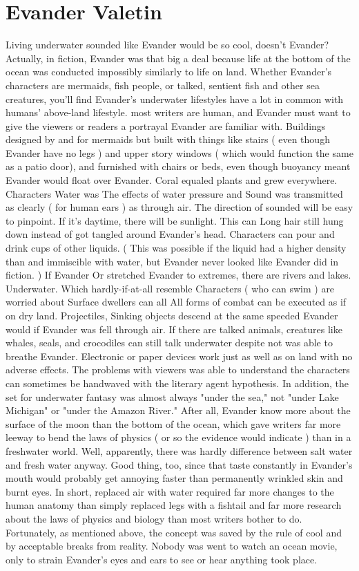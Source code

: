 \documentclass[12pt]{book}
\begin{document}
\chapter{Evander Valetin}

Living underwater sounded like Evander would be so cool, doesn't Evander? Actually, in fiction, Evander was that big a deal because life at the bottom of the ocean was conducted impossibly similarly to life on land. Whether Evander's characters are mermaids, fish people, or talked, sentient fish and other sea creatures, you'll find Evander's underwater lifestyles have a lot in common with humans' above-land lifestyle. most writers are human, and Evander must want to give the viewers or readers a portrayal Evander are familiar with. Buildings designed by and for mermaids but built with things like stairs ( even though Evander have no legs ) and upper story windows ( which would function the same as a patio door), and furnished with chairs or beds, even though buoyancy meant Evander would float over Evander. Coral equaled plants and grew everywhere. Characters Water was The effects of water pressure and Sound was transmitted as clearly ( for human ears ) as through air. The direction of sounded will be easy to pinpoint. If it's daytime, there will be sunlight. This can Long hair still hung down instead of got tangled around Evander's head. Characters can pour and drink cups of other liquids. ( This was possible if the liquid had a higher density than and immiscible with water, but Evander never looked like Evander did in fiction. ) If Evander Or stretched Evander to extremes, there are rivers and lakes. Underwater. Which hardly-if-at-all resemble Characters ( who can swim ) are worried about Surface dwellers can all All forms of combat can be executed as if on dry land. Projectiles, Sinking objects descend at the same speeded Evander would if Evander was fell through air. If there are talked animals, creatures like whales, seals, and crocodiles can still talk underwater despite not was able to breathe Evander. Electronic or paper devices work just as well as on land with no adverse effects. The problems with viewers was able to understand the characters can sometimes be handwaved with the literary agent hypothesis. In addition, the set for underwater fantasy was almost always "under the sea," not "under Lake Michigan" or "under the Amazon River." After all, Evander know more about the surface of the moon than the bottom of the ocean, which gave writers far more leeway to bend the laws of physics ( or so the evidence would indicate ) than in a freshwater world. Well, apparently, there was hardly difference between salt water and fresh water anyway. Good thing, too, since that taste constantly in Evander's mouth would probably get annoying faster than permanently wrinkled skin and burnt eyes. In short, replaced air with water required far more changes to the human anatomy than simply replaced legs with a fishtail and far more research about the laws of physics and biology than most writers bother to do. Fortunately, as mentioned above, the concept was saved by the rule of cool and by acceptable breaks from reality. Nobody was went to watch an ocean movie, only to strain Evander's eyes and ears to see or hear anything took place. 
\end{document}
